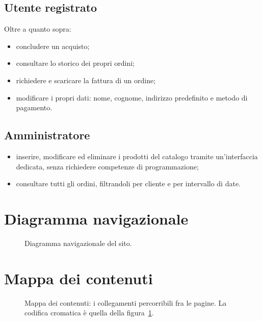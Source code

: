 \documentclass[11pt,a4paper]{article}
\begin{document}
\subsection{Utente registrato}

Oltre a quanto sopra:

\begin{itemize}
  \item concludere un acquisto;
  \item consultare lo storico dei propri ordini;
  \item richiedere e scaricare la fattura di un ordine;
  \item modificare i propri dati: nome, cognome, indirizzo predefinito e metodo
        di pagamento.
\end{itemize}

\subsection{Amministratore}

\begin{itemize}
  \item inserire, modificare ed eliminare i prodotti del catalogo tramite
        un'interfaccia dedicata, senza richiedere competenze di programmazione;
  \item consultare tutti gli ordini, filtrandoli per cliente e per intervallo di
        date.
\end{itemize}

\section{Diagramma navigazionale}

\begin{figure}[H]
  \centering
  \resizebox{\linewidth}{!}{\diagrammaNavigazionale}
  \caption{Diagramma navigazionale del sito.}\label{fig:navigazionale}
\end{figure}

\section{Mappa dei contenuti}

\begin{figure}[H]
  \centering
  \resizebox{\linewidth}{!}{\mappaContenuti}
  \caption{Mappa dei contenuti: i collegamenti percorribili fra le pagine.
           La codifica cromatica è quella della figura~\ref{fig:navigazionale}.}
  \label{fig:contenuti}
\end{figure}
\end{document}
